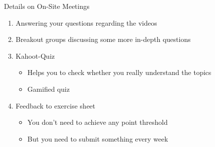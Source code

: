 \documentclass[aspectratio=169]{../latex_main/tntbeamer}  %
\begin{document}
\begin{frame}[c]{Details on On-Site Meetings}
	
	\begin{enumerate}
	    \item Answering your questions regarding the videos
	    \item Breakout groups discussing some more in-depth questions
		\item Kahoot-Quiz
		\begin{itemize}
		    \item Helps you to check whether you really understand the topics
		    \item Gamified quiz 
		\end{itemize}
		\item Feedback to exercise sheet
		\begin{itemize}
			\item You don't need to achieve any point threshold
			\item But you need to submit something every week
		\end{itemize}
	\end{enumerate}
	
\end{frame}
\end{document}
